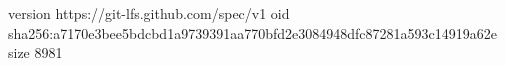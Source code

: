 version https://git-lfs.github.com/spec/v1
oid sha256:a7170e3bee5bdcbd1a9739391aa770bfd2e3084948dfc87281a593c14919a62e
size 8981
